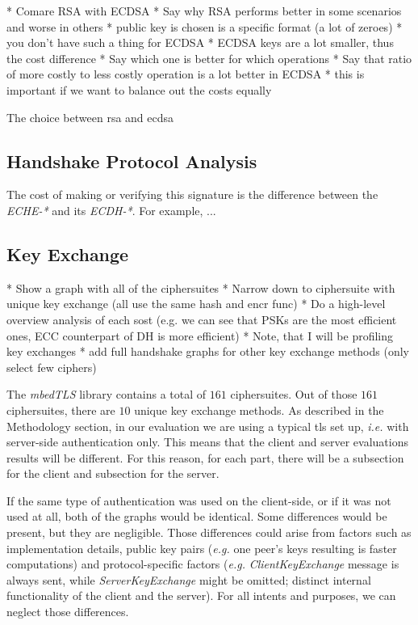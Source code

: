 \documentclass{llncs}
\begin{document}
* Comare RSA with ECDSA 
* Say why RSA performs better in some scenarios and worse in others
  * public key is chosen is a specific format (a lot of zeroes)
    * you don't have such a thing for ECDSA
  * ECDSA keys are a lot smaller, thus the cost difference
* Say which one is better for which operations
* Say that ratio of more costly to less costly operation is a lot better in ECDSA
  * this is important if we want to balance out the costs equally

The choice between \gls{rsa} and \gls{ecdsa}


\subsection{Handshake Protocol Analysis}

The cost of making or verifying this signature is the difference between the \textit{ECHE-*} and its \textit{ECDH-*}.
For example, ...


\subsection{Key Exchange} 
 * Show a graph with all of the ciphersuites
* Narrow down to ciphersuite with unique key exchange (all use the same hash and encr func)
* Do a high-level overview analysis of each sost (e.g. we can see that PSKs are the most efficient ones,
ECC counterpart of DH is more efficient)
* Note, that  I will be profiling key exchanges
* add full handshake graphs for other key exchange methods (only select few ciphers)

The \textit{mbedTLS} library contains a total of $161$ ciphersuites. Out of those $161$ ciphersuites, there are
$10$ unique key exchange methods. As described in the Methodology section, in our evaluation we are using a typical \gls{tls} set up,
\textit{i.e.} with server-side authentication only. This means that the client and server evaluations results will be different.
For this reason, for each part, there will be a subsection for the client and subsection for the server. 

If the same type of authentication
was used on the client-side, or if it was not used at all, both of the graphs would be identical. Some differences would be present,
but they are negligible. Those differences could arise from factors such as implementation details, public key pairs (\textit{e.g.}
one peer's keys resulting is faster computations) and protocol-specific factors (\textit{e.g.} \textit{ClientKeyExchange}
message is always sent, while \textit{ServerKeyExchange} might be omitted; distinct internal functionality of the client 
and the server). For all intents and purposes, we can neglect those differences.
\end{document}
